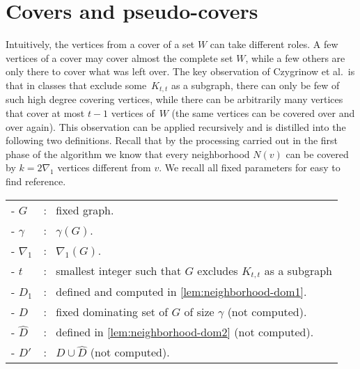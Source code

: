 
\section{Covers and pseudo-covers}

Intuitively, the vertices from a cover of a set $W$ can
take different roles. A few vertices of a cover may cover almost the
complete set $W$, while a few others are only there to cover what was
left over. The key observation of Czygrinow et al.\ is that in classes that
exclude some~$K_{t,t}$ as a subgraph, there can only be few of such
high degree covering vertices, while there can be arbitrarily many vertices
that cover at most $t-1$ vertices of~$W$ (the same vertices can be covered
over and over again). This observation can be applied recursively and is
distilled into the following two definitions. Recall that by the processing
carried out in the first phase of the algorithm
we know that every neighborhood $N(v)$ can be covered by $k=2\nabla_1$ vertices different from $v$.
We recall all fixed parameters for easy to find reference.

\bigskip
\begin{tcolorbox}
\begin{tabular}{l l}
- $G$ & :~ fixed graph. \\
- $\gamma$ & :~ $\gamma(G)$.\\
- $\nabla_1$ & :~ $\nabla_1(G)$. \\
- $t$ & :~ smallest integer such that $G$
excludes $K_{t,t}$ as a subgraph\\
- $D_1$ & :~ defined and computed in \cref{lem:neighborhood-dom1}.\\
- $D$ & :~ fixed dominating set of $G$ of size $\gamma$ (not computed).\\
- $\hat{D}$ & :~ defined in \cref{lem:neighborhood-dom2} (not computed).\\
- $D'$ & :~ $D \cup \hat{D}$ (not computed).
\end{tabular}
\end{tcolorbox}


